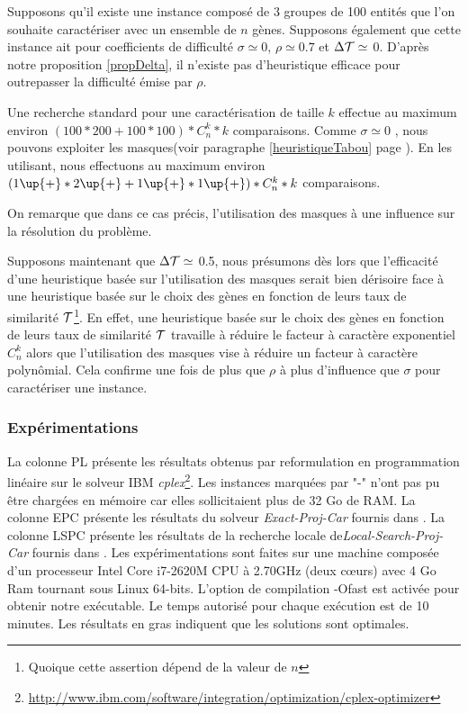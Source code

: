 \begin{exemple}
\label{exempleDifficulté}
Supposons qu'il existe une instance composé de 3 groupes de 100 entités que l'on souhaite caractériser avec un ensemble de $n$ gènes. Supposons également que cette instance ait pour coefficients de difficulté $\sigma \simeq 0$, $\rho \simeq 0.7$ et $\Delta\cal{T} \simeq$ 0. D'après notre proposition \ref{propDelta}, il n'existe pas d'heuristique efficace pour outrepasser la difficulté émise par $\rho$.

Une recherche standard pour une caractérisation de taille $k$ effectue au maximum environ $ (100*200 + 100*100) * C_n^k * k$ comparaisons. Comme $\sigma \simeq 0$ , nous pouvons exploiter les masques(voir paragraphe \ref{heuristiqueTabou} page \pageref{heuristiqueTabou}). En les utilisant, nous effectuons au maximum environ $ (1\up{+} * 2\up{+} + 1\up{+}*1\up{+}) * C_n^k * k $ comparaisons.

On remarque que dans ce cas précis, l'utilisation des masques à une influence sur la résolution du problème.

Supposons maintenant que $\Delta\cal{T} \simeq $ 0.5, nous présumons dès lors que l'efficacité d'une heuristique basée sur l'utilisation des masques serait bien dérisoire face à une heuristique basée sur le choix des gènes en fonction de leurs taux de similarité $\cal{T}$\footnote{Quoique cette assertion dépend de la valeur de $n$}. En effet, une heuristique basée sur le choix des gènes en fonction de leurs taux de similarité $\cal{T}$ travaille à réduire le facteur à caractère exponentiel $C_n^k$ alors que l'utilisation des masques vise à réduire un facteur à caractère polynômial. Cela confirme une fois de plus que $\rho$ à plus d'influence que $\sigma$ pour caractériser une instance.
\end{exemple}



\subsubsection{Expérimentations}
La colonne PL présente les résultats obtenus par reformulation en programmation linéaire sur le solveur IBM \textit{cplex}\footnote{\url{http://www.ibm.com/software/integration/optimization/cplex-optimizer}}. Les instances marquées par "-" n'ont pas pu être chargées en mémoire car elles sollicitaient plus de 32 Go de RAM. La colonne EPC présente les résultats du solveur \emph{Exact-Proj-Car} fournis dans \cite{Chhel2013}. La colonne LSPC présente les résultats de la recherche locale de\emph{Local-Search-Proj-Car} fournis dans \cite{Chhel2013}. Les expérimentations sont faites sur une machine composée d'un processeur Intel Core i7-2620M CPU à 2.70GHz (deux cœurs) avec 4 Go Ram tournant sous Linux 64-bits. L'option de compilation -Ofast est activée pour obtenir notre exécutable. Le temps autorisé pour chaque exécution est de 10 minutes. Les résultats en gras indiquent que les solutions sont optimales.

